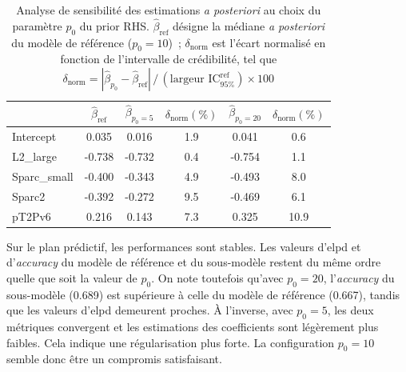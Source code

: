 \begin{table}[ht]
	\centering
	\begin{tabular}{lccccc}
		\hline
		& $\hat\beta_{\text{ref}}$ & $\hat\beta_{p_0=5}$ & $\delta_{\text{norm}} (\%)$ & $\hat\beta_{p_0=20}$ & $\delta_{\text{norm}} (\%)$ \\
		\hline
		Intercept     &  0.035 & 0.016  & 1.9 & 0.041  & 0.6 \\
		L2\_large     & -0.738 & -0.732 & 0.4 & -0.754 & 1.1 \\
		Sparc\_small  & -0.400 & -0.343 & 4.9 & -0.493 & 8.0 \\
		Sparc2        & -0.392 & -0.272 & 9.5 & -0.469 & 6.1 \\
		pT2Pv6        &  0.216 & 0.143  & 7.3 & 0.325  & 10.9 \\
		\hline
	\end{tabular}
	\caption[Analyse de sensibilité au prior $p_0$ pour le modèle complet]{Analyse de sensibilité des estimations \textit{a posteriori} au choix du paramètre $p_0$ du prior RHS. $\hat\beta_{\text{ref}}$ désigne la médiane \textit{a posteriori} du modèle de référence ($p_0 = 10$)~; $\delta_{\text{norm}}$ est l'écart normalisé en fonction de l'intervalle de crédibilité, tel que $\delta_{\text{norm}} = |\hat\beta_{p_0} - \hat\beta_{\text{ref}}|\,/\,(\text{largeur IC}_{95\%}^{\text{ref}}) \times 100$}
	\label{table:sensi_full}
\end{table} 

Sur le plan prédictif, les performances sont stables. Les valeurs d'elpd et d'\textit{accuracy} du modèle de référence et du sous-modèle restent du même ordre quelle que soit la valeur de $p_0$. On note toutefois qu'avec $p_0 = 20$, l'\textit{accuracy} du sous-modèle (0.689) est supérieure à celle du modèle de référence (0.667), tandis que les valeurs d'elpd demeurent proches. À l'inverse, avec $p_0 = 5$, les deux métriques convergent et les estimations des coefficients sont légèrement plus faibles. Cela indique une régularisation plus forte. La configuration $p_0 = 10$ semble donc être un compromis satisfaisant.

%
%
%
%
%
%

